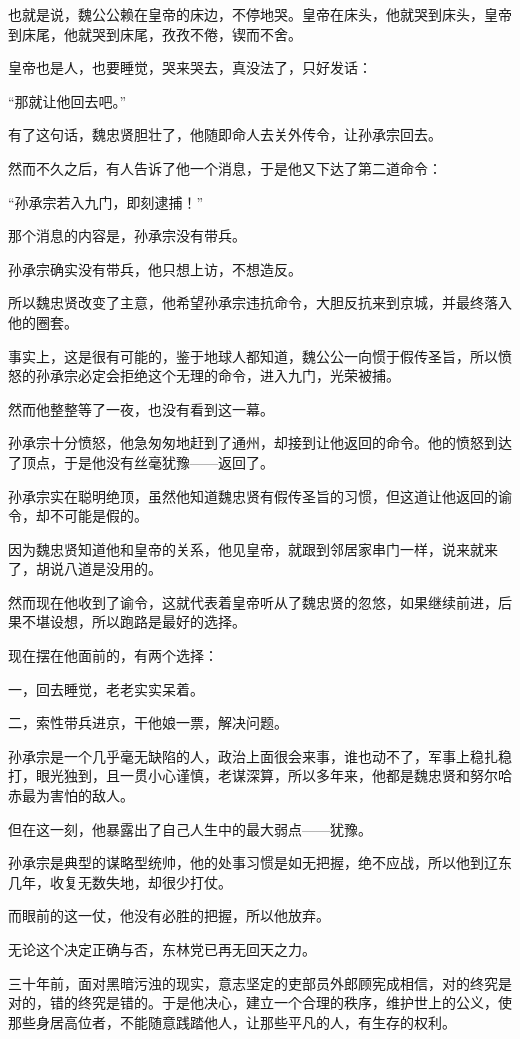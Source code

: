 \begin{multicols}{\theparacolNo}
也就是说，魏公公赖在皇帝的床边，不停地哭。皇帝在床头，他就哭到床头，皇帝到床尾，他就哭到床尾，孜孜不倦，锲而不舍。

皇帝也是人，也要睡觉，哭来哭去，真没法了，只好发话：

“那就让他回去吧。”

有了这句话，魏忠贤胆壮了，他随即命人去关外传令，让孙承宗回去。

然而不久之后，有人告诉了他一个消息，于是他又下达了第二道命令：

“孙承宗若入九门，即刻逮捕！”

那个消息的内容是，孙承宗没有带兵。

孙承宗确实没有带兵，他只想上访，不想造反。

所以魏忠贤改变了主意，他希望孙承宗违抗命令，大胆反抗来到京城，并最终落入他的圈套。

事实上，这是很有可能的，鉴于地球人都知道，魏公公一向惯于假传圣旨，所以愤怒的孙承宗必定会拒绝这个无理的命令，进入九门，光荣被捕。

然而他整整等了一夜，也没有看到这一幕。

孙承宗十分愤怒，他急匆匆地赶到了通州，却接到让他返回的命令。他的愤怒到达了顶点，于是他没有丝毫犹豫——返回了。

孙承宗实在聪明绝顶，虽然他知道魏忠贤有假传圣旨的习惯，但这道让他返回的谕令，却不可能是假的。

因为魏忠贤知道他和皇帝的关系，他见皇帝，就跟到邻居家串门一样，说来就来了，胡说八道是没用的。

然而现在他收到了谕令，这就代表着皇帝听从了魏忠贤的忽悠，如果继续前进，后果不堪设想，所以跑路是最好的选择。

现在摆在他面前的，有两个选择：

一，回去睡觉，老老实实呆着。

二，索性带兵进京，干他娘一票，解决问题。

孙承宗是一个几乎毫无缺陷的人，政治上面很会来事，谁也动不了，军事上稳扎稳打，眼光独到，且一贯小心谨慎，老谋深算，所以多年来，他都是魏忠贤和努尔哈赤最为害怕的敌人。

但在这一刻，他暴露出了自己人生中的最大弱点——犹豫。

孙承宗是典型的谋略型统帅，他的处事习惯是如无把握，绝不应战，所以他到辽东几年，收复无数失地，却很少打仗。

而眼前的这一仗，他没有必胜的把握，所以他放弃。

无论这个决定正确与否，东林党已再无回天之力。

三十年前，面对黑暗污浊的现实，意志坚定的吏部员外郎顾宪成相信，对的终究是对的，错的终究是错的。于是他决心，建立一个合理的秩序，维护世上的公义，使那些身居高位者，不能随意践踏他人，让那些平凡的人，有生存的权利。


\end{multicols}
